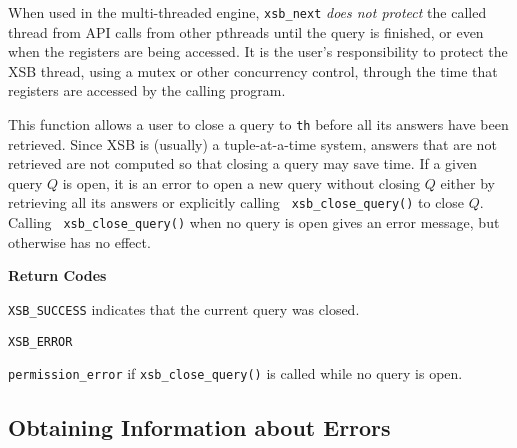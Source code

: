 \begin{description}
When used in the multi-threaded engine, {\tt xsb\_next} {\em does not
  protect} the called thread from API calls from other pthreads until
the query is finished, or even when the registers are being accessed.
It is the user's responsibility to protect the XSB thread, using a
mutex or other concurrency control, through the time that registers
are accessed by the calling program.

 
%
This function allows a user to close a query to {\tt th} before all
its answers have been retrieved.  Since XSB is (usually) a
tuple-at-a-time system, answers that are not retrieved are not
computed so that closing a query may save time.  If a given query $Q$
is open, it is an error to open a new query without closing $Q$ either
by retrieving all its answers or explicitly calling {\tt
  xsb\_close\_query()} to close $Q$.  Calling {\tt
  xsb\_close\_query()} when no query is open gives an error message,
but otherwise has no effect.

{\bf Return Codes}  
\bi
\item {\tt XSB\_SUCCESS} indicates that the current query was closed.
%
\item {\tt XSB\_ERROR} 
\bi
\item {\tt permission\_error} if {\tt xsb\_close\_query()} is
  called while no query is open.
\ei
\ei

\end{description}

\subsection{Obtaining Information about Errors}

